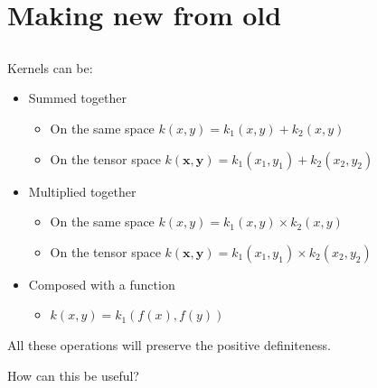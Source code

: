 \documentclass{beamer}
\begin{document}
\section{Making new from old}
\subsection{}




\begin{frame}{}
\begin{block}{}
Kernels can be:
\begin{itemize}
  \item Summed together
  \begin{itemize}
    \item On the same space $k(x,y) = k_1(x,y) + k_2(x,y)$
    \item On the tensor space $k(\mathbf{x},\mathbf{y}) = k_1(x_1,y_1) + k_2(x_2,y_2)$
  \end{itemize} 
  \item Multiplied together
  \begin{itemize}
    \item On the same space $k(x,y) = k_1(x,y) \times k_2(x,y)$
    \item On the tensor space $k(\mathbf{x},\mathbf{y}) = k_1(x_1,y_1) \times k_2(x_2,y_2)$
  \end{itemize} 
  \item Composed with a function
  \begin{itemize}
    \item $k(x,y) = k_1(f(x),f(y))$
  \end{itemize} 
\end{itemize} 
\end{block}
All these operations will preserve the positive definiteness.\\ 
\vspace{0.2cm}
\begin{center}
\alert{How can this be useful?}
\end{center}
\end{frame}
\end{document}
